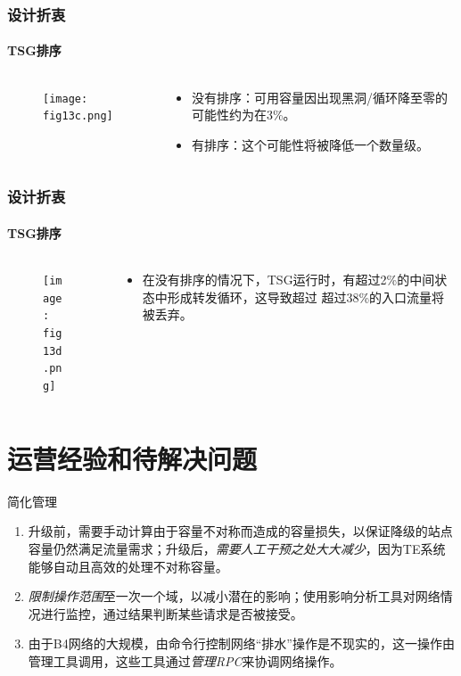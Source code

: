 \begin{frame}
    \frametitle{设计折衷}
    \framesubtitle{TSG排序}
    \begin{columns}
        \begin{column}{0.4\textwidth}
            \begin{figure}
                \texttt{[image: fig13c.png]}
            \end{figure}
        \end{column}
        \begin{column}{0.6\textwidth}
            \begin{itemize}
                \item 没有排序：可用容量因出现黑洞/循环降至零的可能性约为在3\%。
                \item 有排序：这个可能性将被降低一个数量级。
            \end{itemize}
        \end{column}
    \end{columns}
\end{frame}

\begin{frame}
    \frametitle{设计折衷}
    \framesubtitle{TSG排序}
    \begin{columns}
        \begin{column}{0.4\textwidth}
            \begin{figure}
                \texttt{[image: fig13d.png]}
            \end{figure}
        \end{column}
        \begin{column}{0.6\textwidth}
            \begin{itemize}
                \item 在没有排序的情况下，TSG运行时，有超过2\%的中间状态中形成转发循环，这导致超过 超过38\%的入口流量将被丢弃。
            \end{itemize}
        \end{column}
    \end{columns}
\end{frame}

\section{运营经验和待解决问题}
\begin{frame}{简化管理}
    \begin{enumerate}
        \item 升级前，需要手动计算由于容量不对称而造成的容量损失，以保证降级的站点容量仍然满足流量需求；升级后，\emph{需要人工干预之处大大减少}，因为TE系统能够自动且高效的处理不对称容量。
        \item \emph{限制操作范围}至一次一个域，以减小潜在的影响；使用影响分析工具对网络情况进行监控，通过结果判断某些请求是否被接受。
        \item 由于B4网络的大规模，由命令行控制网络“排水”操作是不现实的，这一操作由管理工具调用，这些工具通过\emph{管理RPC}来协调网络操作。
    \end{enumerate}

\end{frame}

